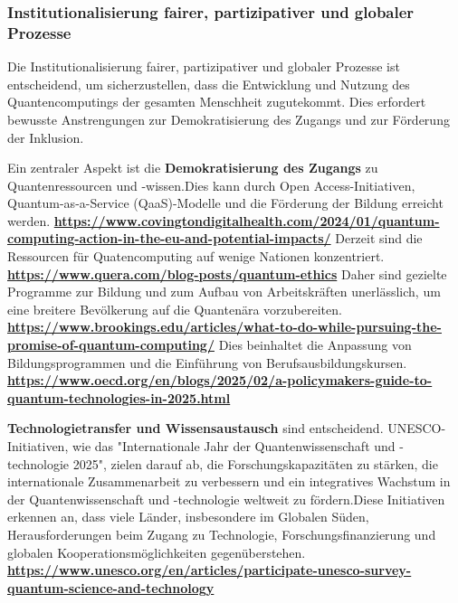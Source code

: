 {\subsubsection{\textbf{Institutionalisierung fairer, partizipativer und globaler Prozesse}}

Die Institutionalisierung fairer, partizipativer und globaler Prozesse ist entscheidend, um sicherzustellen, dass die Entwicklung und Nutzung des Quantencomputings der gesamten Menschheit zugutekommt. Dies erfordert bewusste Anstrengungen zur Demokratisierung des Zugangs und zur Förderung der Inklusion.

Ein zentraler Aspekt ist die \textbf{Demokratisierung des Zugangs} zu Quantenressourcen und -wissen.Dies kann durch Open Access-Initiativen, Quantum-as-a-Service (QaaS)-Modelle und die Förderung der Bildung erreicht werden. \textbf{\href{https://www.covingtondigitalhealth.com/2024/01/quantum-computing-action-in-the-eu-and-potential-impacts/}{https://www.covingtondigitalhealth.com/2024/01/quantum-computing-action-in-the-eu-and-potential-impacts/}} Derzeit sind die Ressourcen für Quatencomputing auf wenige Nationen konzentriert. \textbf{\href{https://www.quera.com/blog-posts/quantum-ethics}{https://www.quera.com/blog-posts/quantum-ethics}} Daher sind gezielte Programme zur Bildung und zum Aufbau von Arbeitskräften unerlässlich, um eine breitere Bevölkerung auf die Quantenära vorzubereiten. \textbf{\href{https://www.brookings.edu/articles/what-to-do-while-pursuing-the-promise-of-quantum-computing/}{https://www.brookings.edu/articles/what-to-do-while-pursuing-the-promise-of-quantum-computing/}} Dies beinhaltet die Anpassung von Bildungsprogrammen und die Einführung von Berufsausbildungskursen. \textbf{\href{https://www.oecd.org/en/blogs/2025/02/a-policymakers-guide-to-quantum-technologies-in-2025.html}{https://www.oecd.org/en/blogs/2025/02/a-policymakers-guide-to-quantum-technologies-in-2025.html}}

\textbf{Technologietransfer und Wissensaustausch} sind entscheidend. UNESCO-Initiativen, wie das "Internationale Jahr der Quantenwissenschaft und -technologie 2025", zielen darauf ab, die Forschungskapazitäten zu stärken, die internationale Zusammenarbeit zu verbessern und ein integratives Wachstum in der Quantenwissenschaft und -technologie weltweit zu fördern.Diese Initiativen erkennen an, dass viele Länder, insbesondere im Globalen Süden, Herausforderungen beim Zugang zu Technologie, Forschungsfinanzierung und globalen Kooperationsmöglichkeiten gegenüberstehen. \textbf{\href{https://www.unesco.org/en/articles/participate-unesco-survey-quantum-science-and-technology}{https://www.unesco.org/en/articles/participate-unesco-survey-quantum-science-and-technology}}

}
